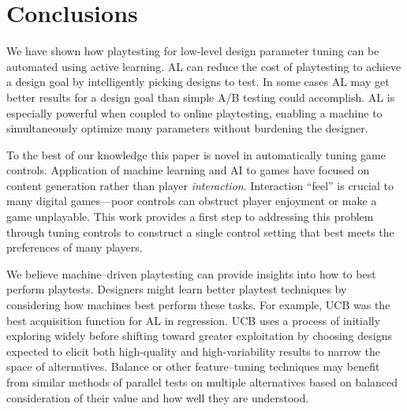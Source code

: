 \documentclass{sig-alternate}
\begin{document}

\section{Conclusions}





We have shown how playtesting for low-level design parameter tuning can be automated using active learning.
AL can reduce the cost of playtesting to achieve a design goal by intelligently picking designs to test.
In some cases AL may get better results for a design goal than simple A/B testing could accomplish.
AL is especially powerful when coupled to online playtesting, enabling a machine to simultaneously optimize many parameters without burdening the designer.

To the best of our knowledge this paper is novel in automatically tuning game controls. %
Application of machine learning and AI to games have focused on content generation rather than player \textit{interaction}.
Interaction ``feel'' is crucial to many digital games---poor controls can obstruct player enjoyment or make a game unplayable.
This work provides a first step to addressing this problem through tuning controls to construct a single control setting that best meets the preferences of many players.

We believe machine--driven playtesting can provide insights into how to best perform playtests.
Designers might learn better playtest techniques by considering how machines best perform these tasks.
For example, UCB was the best acquisition function for AL in regression.
UCB uses a process of initially exploring widely before shifting toward greater exploitation by choosing designs expected to elicit both high-quality and high-variability results to narrow the space of alternatives.
Balance or other feature--tuning techniques may benefit from similar methods of parallel tests on multiple alternatives based on balanced consideration of their value and how well they are understood.
\end{document}
